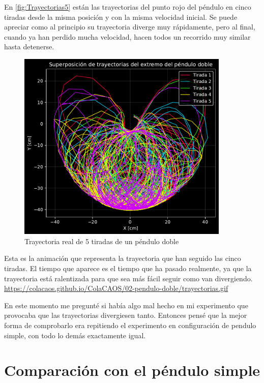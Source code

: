 \documentclass[
  10pt,
  a4paper,
  DIV=11,
  numbers=noendperiod,
  open=any]{scrreprt}
\numberwithin{equation}{chapter}
\numberwithin{equation}{section}
\renewcommand{\[}{\begin{equation}}
\renewcommand{\]}{\end{equation}}
\begin{document}
En \autoref{fig:Trayectorias5} están las trayectorias del punto rojo del péndulo en cinco tiradas
desde la misma posición y con la misma velocidad inicial. Se puede
apreciar como al principio su trayectoria diverge muy rápidamente, pero
al final, cuando ya han perdido mucha velocidad, hacen todos un
recorrido muy similar hasta detenerse.


\begin{figure}[h]
  \centering
  \includegraphics[width=0.9\textwidth]{02-pendulo-doble/experimentos_files/figure-pdf/cell-2-output-1.pdf}
  \caption{Trayectoria real de 5 tiradas de un péndulo doble}
  \label{fig:Trayectorias5}
\end{figure}

Esta es la animación que representa la trayectoria que han seguido las cinco
tiradas. El tiempo que aparece es el tiempo que ha pasado realmente, ya
que la trayectoria está ralentizada para que sea más fácil seguir como
van divergiendo.  \url{https://colacaos.github.io/ColaCAOS/02-pendulo-doble/trayectorias.gif}


En este momento me pregunté si había algo mal hecho en mi experimento que provocaba que las trayectorias divergiesen tanto. Entonces pensé que la mejor forma de comprobarlo era repitiendo el experimento en configuración de pendulo simple, con todo lo demás exactamente igual.

\section{Comparación con el péndulo
simple}\label{comparaciuxf3n-con-el-puxe9ndulo-simple}
\end{document}
